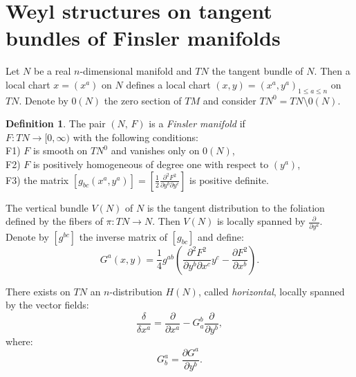 \documentclass[11pt,oneside,english]{amsart}
\numberwithin{equation}{section}
\numberwithin{figure}{section}
\theoremstyle{plain}
\theoremstyle{definition}
\newtheorem{defn}[thm]{Definition}
\theoremstyle{definition}
\theoremstyle{plain}
\theoremstyle{plain}
\theoremstyle{remark}
\theoremstyle{remark}
\begin{document}
\section{Weyl structures on tangent bundles of Finsler manifolds}

Let $N$ be a real $n$-dimensional manifold and $TN$ the tangent
bundle of $N$. Then a local chart $x=(x^{a})$ on $N$ defines a
local chart $(x,y)=(x^{a},y^{a})_{1\leq a\leq n}$ on $TN$. Denote
by $0(N)$ the zero section of $TM$ and consider $TN^{0}=TN\setminus0(N)$.

\medskip{}

\begin{defn}
The pair $(N,\, F)$ is a \textit{Finsler manifold} if \\
 $F:TN\rightarrow[0,\infty)$ with the following conditions: \\
 F1) $F$ is smooth on $TN^{0}$ and vanishes only on $0(N)$, \\
 F2) $F$ is positively homogeneous of degree one with respect to
$(y^{a})$, \\
 F3) the matrix $[g_{bc}(x^{a},y^{a})]=[\frac{1}{2}\frac{\partial^{2}F^{2}}{\partial y^{b}\partial y^{c}}]$
is positive definite.
\end{defn}
The vertical bundle $V(N)$ of $N$ is the tangent distribution to
the foliation defined by the fibers of $\pi:TN\rightarrow N.$ Then
$V(N)$ is locally spanned by ${\frac{\partial}{\partial y^{a}}}$.
Denote by $[g^{bc}]$ the inverse matrix of $[g_{bc}]$ and define:
\begin{equation}
G^{a}(x,y)=\frac{1}{4}g^{ab}\left(\frac{\partial^{2}F^{2}}{\partial y^{b}\partial x^{c}}y^{c}-\frac{\partial F^{2}}{\partial x^{b}}\right).\label{eq:31}\end{equation}

There exists on $TN$ an $n$-distribution $H(N)$, called \textit{horizontal},
locally spanned by the vector fields: \begin{equation}
\frac{\delta}{\delta x^{a}}=\frac{\partial}{\partial x^{a}}-G_{a}^{b}\frac{\partial}{\partial y^{b}},\label{eq:32}\end{equation}
 where: \begin{equation}
G_{b}^{a}=\frac{\partial G^{a}}{\partial y^{b}}.\label{eq:33}\end{equation}
\end{document}
